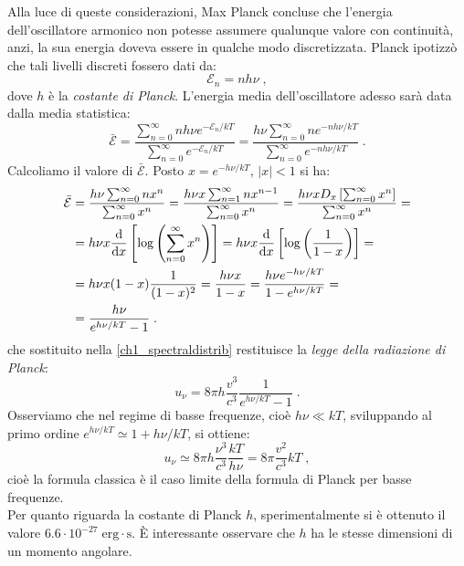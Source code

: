 \documentclass[12pt,a4paper]{report}
\theoremstyle{definition}
\numberwithin{equation}{section}
\newcommand{\diff}[1][]{\mathrm{d}#1}
\begin{document}
Alla luce di queste considerazioni, Max Planck concluse che l'energia dell'oscillatore armonico non potesse assumere qualunque valore con continuità, anzi, la sua energia doveva essere in qualche modo discretizzata. Planck ipotizzò che tali livelli discreti fossero dati da:
\begin{equation}
\mathcal{E}_n = nh\nu\;,
\end{equation}
dove $h$ è la \textit{costante di Planck}. L'energia media dell'oscillatore adesso sarà data dalla media statistica:
\begin{equation}
\bar{\mathcal{E}}=\frac{\sum_{n=0}^{\infty}nh\nu e^{-\mathcal{E}_n/kT}}{\sum_{n=0}^{\infty}e^{-\mathcal{E}_n/kT}}=\frac{h\nu\sum_{n=0}^{\infty}n e^{-nh\nu/kT}}{\sum_{n=0}^{\infty} e^{-nh\nu/kT}}\;.
\end{equation}
Calcoliamo il valore di $\bar{\mathcal{E}}$. Posto $x=e^{-h\nu/kT}$, $|x|<1$ si ha:
\begin{align}
\bar{\mathcal{E}} &= \frac{h\nu\sum_{n=0}^{\infty}n x^n}{\sum_{n=0}^{\infty} x^n}=\frac{h\nu x\sum_{n=1}^{\infty}n x^{n-1}}{\sum_{n=0}^{\infty} x^n}=\frac{h\nu x D_x\left[\sum_{n=0}^{\infty} x^n\right]}{\sum_{n=0}^{\infty} x^n} = \notag \\
&= h\nu x \frac{\mathrm{d}}{\diff{x}}\left[\log\left(\sum_{n=0}^{\infty} x^n\right)\right]=
h\nu x \frac{\mathrm{d}}{\diff{x}}\left[\log\left(\frac{1}{1-x}\right)\right]= \notag \\
&= h\nu x (1-x)\frac{1}{(1-x)^2}=\frac{h\nu x}{1-x}=\frac{h\nu e^{-h\nu/kT}}{1-e^{h\nu/kT}}= \notag \\
&= \frac{h\nu}{e^{h\nu/kT}-1}\;.
\end{align}
che sostituito nella \eqref{ch1_spectraldistrib} restituisce la \textit{legge della radiazione di Planck}:
\begin{equation}
u_{\nu}=8\pi h\frac{v^3}{c^3}\frac{1}{e^{h\nu/kT}-1}\;. \label{ch1_plancklaw}
\end{equation}
Osserviamo che nel regime di basse frequenze, cioè $h\nu\ll kT$, sviluppando al primo ordine $e^{h\nu/kT}\simeq 1+h\nu/kT$, si ottiene:
$$
u_{\nu}\simeq 8\pi h\frac{\nu^3}{c^3}\frac{kT}{h\nu}=8\pi \frac{v^2}{c^3}kT\;,
$$
cioè la formula classica è il caso limite della formula di Planck per basse frequenze. \\
Per quanto riguarda la costante di Planck $h$, sperimentalmente si è ottenuto il valore $6.6 \cdot 10^{-27}\; \mathrm{erg\cdot s}$. È interessante osservare che $h$ ha le stesse dimensioni di un momento angolare.
\end{document}
